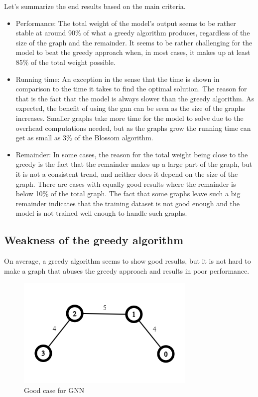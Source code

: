 Let's summarize the end results based on the main criteria.
\begin{itemize}
\item Performance: The total weight of the model's output seems to be rather stable at around 90\% of what a greedy algorithm produces, regardless of the size of the graph and the remainder. It seems to be rather challenging for the model to beat the greedy approach when, in most cases, it makes up at least 85\% of the total weight possible.
\item Running time: An exception in the sense that the time is shown in comparison to the time it takes to find the optimal solution. The reason for that is the fact that the model is always slower than the greedy algorithm. As expected, the benefit of using the \gls{gnn} can be seen as the size of the graphs increases. Smaller graphs take more time for the model to solve due to the overhead computations needed, but as the graphs grow the running time can get as small as 3\% of the Blossom algorithm.
\item Remainder: In some cases, the reason for the total weight being close to the greedy is the fact that the remainder makes up a large part of the graph, but it is not a consistent trend, and neither does it depend on the size of the graph. There are cases with equally good results where the remainder is below 10\% of the total graph. The fact that some graphs leave such a big remainder indicates that the training dataset is not good enough and the model is not trained well enough to handle such graphs.
\end{itemize}

\subsection{Weakness of the greedy algorithm}
\label{sec:greedybadcase}
On average, a greedy algorithm seems to show good results, but it is not hard to make a graph that abuses the greedy approach and results in poor performance.

\begin{figure}[H]
    \centering
    \includegraphics[scale=1.0]{figures/GoodCase}
    \caption{Good case for GNN}
    \label{Good case for GNN}
\end{figure}

